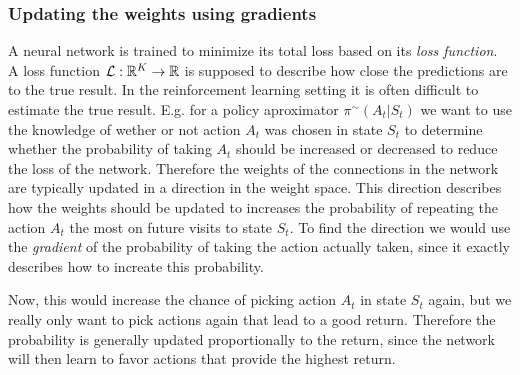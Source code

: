 \documentclass[11pt]{article}
\begin{document}
\subsubsection{Updating the weights using gradients}

A neural network is trained to minimize its total loss based on its \textit{loss
function}.
A loss function $\mathcal{L} : \mathbb{R}^K \to \mathbb{R}$ is supposed to describe how close the
predictions are to the true result.
In the reinforcement learning setting it is often difficult to estimate the
true result.
E.g. for a policy aproximator $\pi^{\sim}(A_t | S_t)$ we want to use the knowledge
of wether or not action $A_t$ was  chosen in state $S_t$ to determine
whether the probability of taking $A_t$ should be increased or decreased to
reduce the loss of the network.
Therefore the weights of the connections in the network are typically updated
in a direction in the weight space.
This direction describes how the weights should be updated to increases the
probability of repeating the action $A_t$ the most on future visits to
state $S_t$\cite{RLbook}.
To find the direction we would use the \textit{gradient} of the probability of
taking the action actually taken, since it exactly describes how to increate
this probability.

Now, this would increase the chance of picking action $A_t$ in state $S_t$ again,
but we really only want to pick actions again that lead to a good return.
Therefore the probability is generally updated proportionally to the
return, since the network will then learn to favor actions that provide
the highest return.
\end{document}
